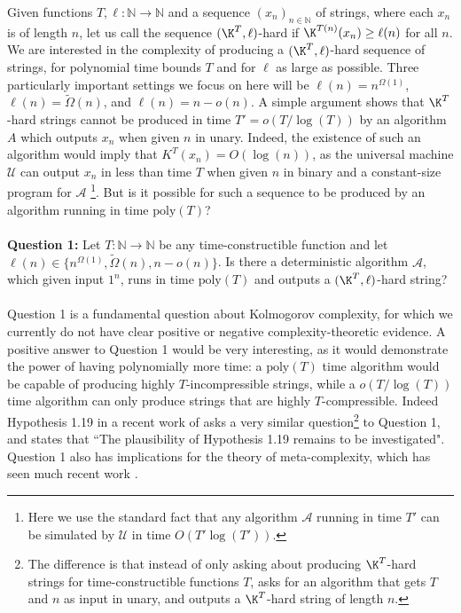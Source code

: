 \documentclass[11pt]{article}
\renewcommand{\poly}{\mathrm{poly}}
\begin{document}
Given functions $T,\ell: \mathbb{N} \rightarrow \mathbb{N}$ and a sequence $(x_n)_{n\in \mathbb{N}}$ of strings, where each $x_n$ is of length $n$, let us call the sequence $(\K^T,\ell)$-hard if $\K^{T(n)}(x_n) \geq \ell(n)$ for all $n$. We are interested in the complexity of producing a $(\K^T,\ell)$-hard sequence of strings, for polynomial time bounds $T$ and for $\ell$ as large as possible. Three particularly important settings we focus on here will be $\ell(n) = n^{\Omega(1)}$, $\ell(n) = \tilde{\Omega}(n)$, and $\ell(n) = n - o(n)$. A simple argument shows that $\K^T$-hard strings cannot be produced in time $T' = o(T/\log(T))$ by an algorithm $A$ which outputs $x_n$ when given $n$ in unary. Indeed, the existence of such an algorithm would imply that $K^T(x_n) = O(\log(n))$, as the universal machine $\mathcal{U}$ can output $x_n$ in less than time $T$ when given $n$ in binary and a constant-size program for $\mathcal{A}$ \footnote{Here we use the standard fact that any algorithm $\mathcal{A}$ running in time $T'$ can be simulated by $\mathcal{U}$ in time $O(T' \log(T'))$.}. But is it possible for such a sequence to be produced by an algorithm running in time $\poly(T)$? \\
\\
{\bf \noindent Question 1:} Let $T: \mathbb{N} \rightarrow \mathbb{N}$ be any time-constructible function and let $\ell(n) \in \{ n^{\Omega(1)}, \tilde{\Omega}(n), n - o(n)\}$. Is there a deterministic algorithm $\mathcal{A}$, which given input $1^n$, runs in time $\poly(T)$ and outputs a $(\K^T,\ell)$-hard string? \\
\\
Question 1 is a fundamental question about Kolmogorov complexity, for which we currently do not have clear positive or negative complexity-theoretic evidence. A positive answer to Question 1 would be very interesting, as it would demonstrate the power of having polynomially more time: a $\poly(T)$ time algorithm would be capable of producing highly $T$-incompressible strings, while a $o(T/\log(T))$ time algorithm can only produce strings that are highly $T$-compressible. Indeed Hypothesis 1.19 in a recent work of \cite{RSW22} asks a very similar question\footnote{The difference is that instead of only asking about producing $\K^T$-hard strings for time-constructible functions $T$, \cite{RSW22} asks for an algorithm that gets $T$ and $n$ as input in unary, and outputs a $\K^T$-hard string of length $n$.} to Question 1, and states that ``The plausibility of Hypothesis 1.19 remains to be investigated". Question 1 also has implications for the theory of meta-complexity, which has seen much recent work \cite{Allender17, Hirahara22, LO22}.
\end{document}
